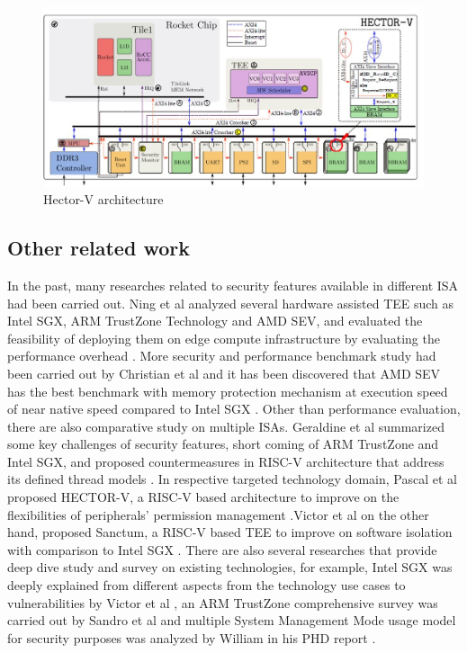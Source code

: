 \documentclass[review]{elsarticle}
\begin{document}
\begin{figure}[H]
	\centering
	\includegraphics[width=1\textwidth]{figs/Hector.JPG}
	\caption{Hector-V architecture}
\end{figure}


\subsection{ Other related work}
In the past, many researches related to security features available in different ISA had been carried out.
Ning et al analyzed several hardware assisted TEE such as Intel SGX, ARM TrustZone Technology
and AMD SEV, and evaluated the feasibility of deploying them on edge compute infrastructure by evaluating the performance overhead \cite{R5:2}.
More security and performance benchmark study had been carried out by Christian et al and it has been discovered that AMD SEV has the best benchmark with memory protection mechanism at execution speed of near native speed compared to Intel SGX \cite{R5:3}.
Other than performance evaluation, there are also comparative study on multiple ISAs. Geraldine et
al summarized some key challenges of security features, short coming of ARM TrustZone and Intel SGX, and proposed countermeasures in RISC-V architecture that address its defined thread models \cite{R5:4}.
In respective targeted technology domain, Pascal et al proposed HECTOR-V, a RISC-V based architecture to improve on the flexibilities of peripherals’ permission management \cite{R5:5}.Victor et al on the other hand, proposed Sanctum, a RISC-V based TEE to improve on software isolation with comparison to Intel SGX \cite{R5:6}. There are also several researches that provide deep dive study and survey on existing technologies, for example, Intel SGX was deeply explained from different aspects from the technology use cases to vulnerabilities by Victor et al \cite{R5:7}, an ARM TrustZone comprehensive survey was carried out by Sandro et al \cite{R5:8} and multiple System Management Mode usage model for security purposes was analyzed by William in his PHD report \cite{R5:9}.
\end{document}
